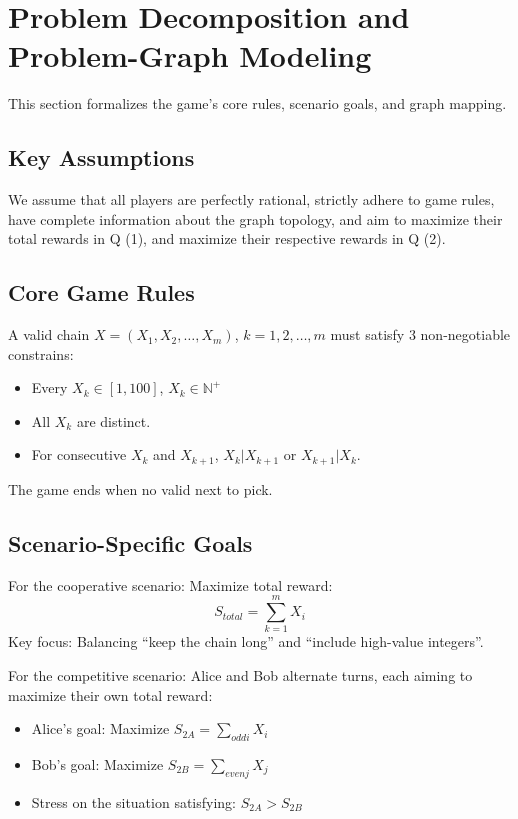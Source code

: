 \documentclass[twocolumn, a4paper]{article}
\begin{document}
\section{Problem Decomposition and Problem-Graph Modeling}
This section formalizes the game's core rules, scenario goals, and graph mapping. 
\subsection{Key Assumptions}
We assume that all players are perfectly rational, strictly adhere to game rules, have complete information about the graph topology, and aim to maximize their total rewards in Q (1), and maximize their respective rewards in Q (2).
\subsection{Core Game Rules}
A valid chain $X=(X_1, X_2, \dots, X_m)$, $k=1, 2, \dots,m$ must satisfy 3 non-negotiable constrains:
\begin{itemize}
    \item Every $X_k\in [1, 100]$, $X_k\in \mathbb{N} ^+$
    \item All $X_k$ are distinct.
    \item For consecutive $X_k$ and $X_{k+1}$, $X_k | X_{k+1}$ or $X_{k+1} | X_k$.
\end{itemize}
The game ends when no valid next to pick.
\subsection{Scenario-Specific Goals}
For the cooperative scenario: Maximize total reward:\[S_{total}=\sum_{k=1}^{m}X_i\]
Key focus: Balancing ``keep the chain long'' and ``include high-value integers''.

For the competitive scenario: Alice and Bob alternate turns, each aiming to maximize their own total reward:
\begin{itemize}
    \item Alice's goal: Maximize $S_{2A}=\sum_{odd i}X_i$
    \item Bob's goal: Maximize $S_{2B}=\sum_{even j}X_j$
    \item Stress on the situation satisfying: $S_{2A} > S_{2B}$
\end{itemize}
\end{document}
